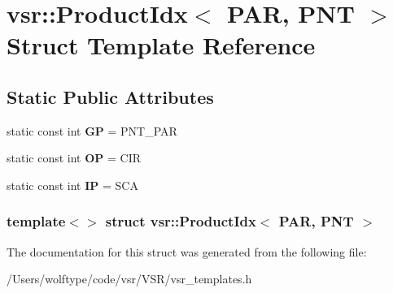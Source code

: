 \hypertarget{structvsr_1_1_product_idx_3_01_p_a_r_00_01_p_n_t_01_4}{\section{vsr\-:\-:Product\-Idx$<$ P\-A\-R, P\-N\-T $>$ Struct Template Reference}
\label{structvsr_1_1_product_idx_3_01_p_a_r_00_01_p_n_t_01_4}
}
\subsection*{Static Public Attributes}
\begin{DoxyCompactItemize}
\item 
\hypertarget{structvsr_1_1_product_idx_3_01_p_a_r_00_01_p_n_t_01_4_acf25c568d90756b84ae15540c078f338}{static const int {\bfseries G\-P} = P\-N\-T\-\_\-\-P\-A\-R}\label{structvsr_1_1_product_idx_3_01_p_a_r_00_01_p_n_t_01_4_acf25c568d90756b84ae15540c078f338}

\item 
\hypertarget{structvsr_1_1_product_idx_3_01_p_a_r_00_01_p_n_t_01_4_ae94ba1865a329dfcc25f07a142925ee9}{static const int {\bfseries O\-P} = C\-I\-R}\label{structvsr_1_1_product_idx_3_01_p_a_r_00_01_p_n_t_01_4_ae94ba1865a329dfcc25f07a142925ee9}

\item 
\hypertarget{structvsr_1_1_product_idx_3_01_p_a_r_00_01_p_n_t_01_4_a77cbf5ec375d96919e049442ebb85862}{static const int {\bfseries I\-P} = S\-C\-A}\label{structvsr_1_1_product_idx_3_01_p_a_r_00_01_p_n_t_01_4_a77cbf5ec375d96919e049442ebb85862}

\end{DoxyCompactItemize}
\subsubsection*{template$<$$>$ struct vsr\-::\-Product\-Idx$<$ P\-A\-R, P\-N\-T $>$}



The documentation for this struct was generated from the following file\-:\begin{DoxyCompactItemize}
\item 
/\-Users/wolftype/code/vsr/\-V\-S\-R/vsr\-\_\-templates.\-h\end{DoxyCompactItemize}
